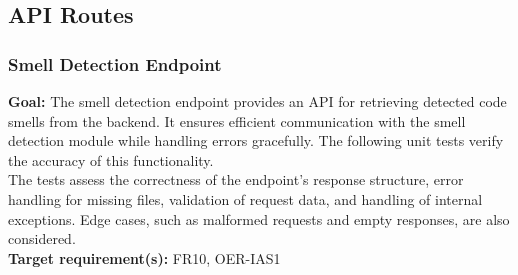 \documentclass[12pt, titlepage]{article}
\begin{document}
  \subsection{API Routes}

  \subsubsection{Smell Detection Endpoint}

  \textbf{Goal:} The smell detection endpoint provides an API for
  retrieving detected code smells from the backend. It ensures
  efficient communication with the smell detection module while
  handling errors gracefully. The following unit tests verify the
  accuracy of this functionality.\\

  \noindent The tests assess the correctness of the endpoint’s
  response structure, error handling for missing files, validation of
  request data, and handling of internal exceptions. Edge cases, such
  as malformed requests and empty responses, are also considered.\\

  \noindent\textbf{Target requirement(s):} FR10, OER-IAS1~\cite{SRS} \\
\end{document}
